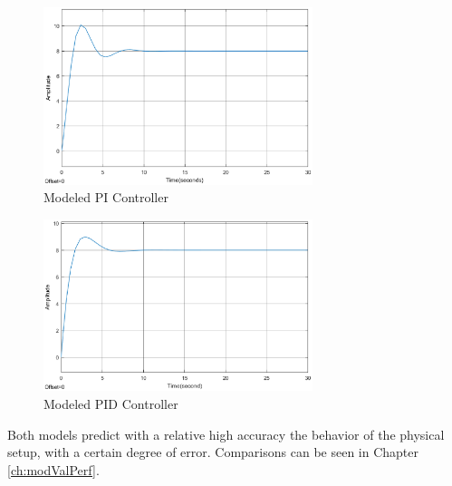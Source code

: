 \begin{figure}[ht]
	\centering
	\includegraphics[width=0.7\textwidth]{figures/06ModelValidation/modelPI.eps}
	\caption{Modeled PI Controller}
	\label{fig:modeledPI}
\end{figure}
\vspace{-5mm}
\begin{figure}[ht]
	\centering
	\includegraphics[width=0.7\textwidth]{figures/06ModelValidation/modelPID.eps}
	\caption{Modeled PID Controller}
	\label{fig:modeledPID}
\end{figure}

Both models predict with a relative high accuracy the  behavior of the physical setup, 
with a certain degree of error. Comparisons can be seen in Chapter \ref{ch:modValPerf}.